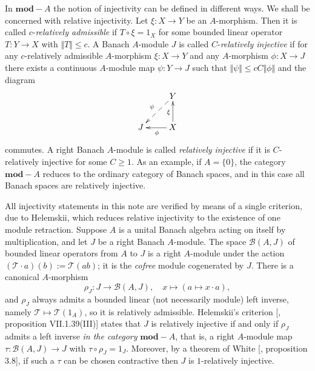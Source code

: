 \documentclass[12pt]{article}
\begin{document}
In $\mathbf{mod}-A$ the notion of injectivity can be defined in different ways. 
We shall be concerned with relative injectivity. Let $\xi:X\to Y$ be an 
$A$-morphism. 
Then it is called $c$-\textit{relatively admissible} if $T\circ \xi=1_X$ 
for some bounded linear operator $T:Y\to X$ with $\Vert T\Vert\leq c$. 
A Banach $A$-module $J$ is called $C$-\textit{relatively injective} if for any 
$c$-relatively admissible $A$-morphism $\xi:X\to Y$ and 
any $A$-morphism $\phi:X\to J$ there exists a continuous $A$-module 
map $\psi:Y\to J$ such that $\Vert\psi\Vert\leq cC\Vert\phi\Vert$ and the 
diagram
\[
    \xymatrix{
    & {Y} \\
    {J} \ar@{<--}[ur]^{\psi} &{X} \ar[u]^{\xi} \ar[l]^{\phi}}  %
\]
commutes. A right Banach $A$-module is called \textit{relatively injective} 
if it is $C$-relatively injective for some $C\geq 1$. As an example, 
if $A=\{0\}$, the category $\mathbf{mod}-A$ reduces to the ordinary category of 
Banach spaces, and in this case all Banach spaces are relatively injective. 

All injectivity statements in this note are verified by means of a single 
criterion, due to Helemskii, which reduces relative injectivity to the 
existence of one module retraction. Suppose $A$ is a unital Banach algebra 
acting on itself by multiplication, and let $J$ be a right Banach $A$-module. 
The space $\mathcal{B}(A, J)$ of bounded linear operators from $A$ to $J$ is a 
right $A$-module under the action $(\mathcal{T}\cdot a)(b):=\mathcal{T}(ab)$; it 
is the \textit{cofree} module cogenerated by $J$. There is a canonical 
$A$-morphism
\[
    \rho_J: J\to\mathcal{B}(A, J),\quad x\mapsto(a\mapsto x\cdot a),
\]
and $\rho_J$ always admits a bounded linear (not necessarily module) left 
inverse, namely $\mathcal{T}\mapsto\mathcal{T}(1_A)$, so it is relatively 
admissible. Helemskii's criterion [\cite{HelBanLocConvAlg}, proposition 
VII.1.39(III)] states that $J$ is relatively injective if and only if 
$\rho_J$ admits a left inverse \textit{in the category} $\mathbf{mod}-A$, that 
is, a right $A$-module map $\tau:\mathcal{B}(A, J)\to J$ 
with $\tau\circ\rho_J=1_J$. Moreover, by a theorem of 
White [\cite{WhiteInjmoduAlg}, proposition 3.8], if such a $\tau$ can be chosen 
contractive then $J$ is $1$-relatively injective.

\end{document}
